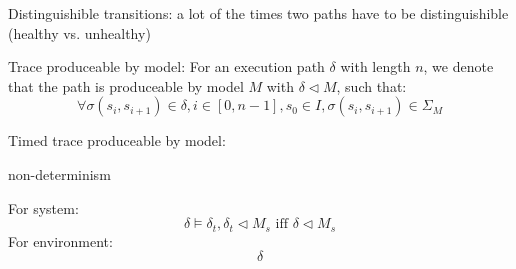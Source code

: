 Distinguishible transitions: a lot of the times two paths have to be distinguishible (healthy vs. unhealthy)


Trace produceable by model: For an execution path $\delta$ with length $n$, we denote that the path is produceable by model $M$ with $\delta\triangleleft M$, such that:
$$\forall \sigma(s_i,s_{i+1})\in \delta,i\in[0,n-1], s_0\in I, \sigma(s_i,s_{i+1})\in\Sigma_M$$

Timed trace produceable by model:


non-determinism

For system:
$$\delta\models\delta_t,\delta_t\triangleleft M_s \text {  iff  } \delta\triangleleft M_s$$
For environment:
$$\delta$$
%
%
%
